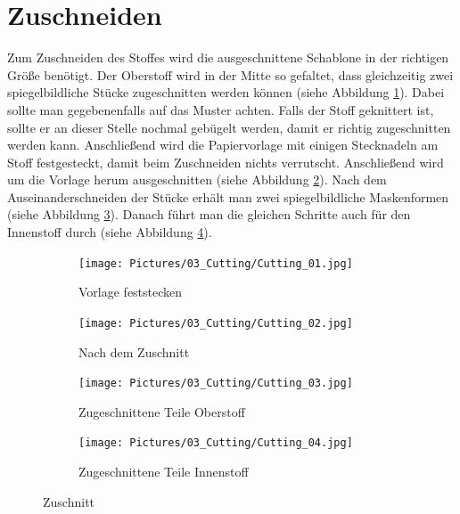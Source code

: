 \documentclass[12pt,parskip=full]{scrartcl}
\begin{document}
\section{Zuschneiden}
Zum Zuschneiden des Stoffes wird die ausgeschnittene Schablone in der richtigen Größe benötigt. Der Oberstoff wird in der Mitte so gefaltet, dass gleichzeitig zwei spiegelbildliche Stücke zugeschnitten werden können (siehe Abbildung \ref{Cutting1}). Dabei sollte man gegebenenfalls auf das Muster achten. Falls der Stoff geknittert ist, sollte er an dieser Stelle nochmal gebügelt werden, damit er richtig zugeschnitten werden kann. Anschließend wird die Papiervorlage mit einigen Stecknadeln am Stoff festgesteckt, damit beim Zuschneiden nichts verrutscht. Anschließend wird um die Vorlage herum ausgeschnitten (siehe Abbildung \ref{Cutting2}). Nach dem Auseinanderschneiden der Stücke erhält man zwei spiegelbildliche Maskenformen (siehe Abbildung \ref{Cutting3}). Danach führt man die gleichen Schritte auch für den Innenstoff durch (siehe Abbildung \ref{Cutting4}).

\begin{figure}[ht]
    \vspace{0.5cm}
    \centering
    \begin{subfigure}{0.48\textwidth}
        \centering
        \texttt{[image: Pictures/03\_Cutting/Cutting\_01.jpg]}
        \caption{Vorlage feststecken}
        \label{Cutting1}
    \end{subfigure}
    \begin{subfigure}{0.48\textwidth}
        \centering
        \texttt{[image: Pictures/03\_Cutting/Cutting\_02.jpg]}
        \caption{Nach dem Zuschnitt}
        \label{Cutting2}
    \end{subfigure}
    \begin{subfigure}{0.48\textwidth}
        \centering
        \texttt{[image: Pictures/03\_Cutting/Cutting\_03.jpg]}
        \caption{Zugeschnittene Teile Oberstoff}
        \label{Cutting3}
    \end{subfigure}
    \begin{subfigure}{0.48\textwidth}
        \centering
        \texttt{[image: Pictures/03\_Cutting/Cutting\_04.jpg]}
        \caption{Zugeschnittene Teile Innenstoff}
        \label{Cutting4}
    \end{subfigure}
    \caption{Zuschnitt}
    \label{Cutting}
\end{figure}
\end{document}
